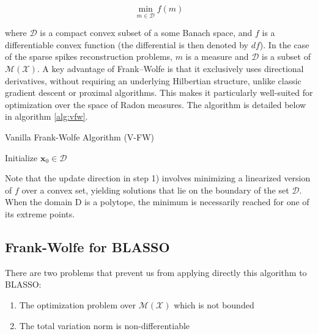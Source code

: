 \documentclass[a4paper,12pt,oneside]{report}
\theoremstyle{named}
\begin{document}
\begin{equation}
    \min_{m \in \mathcal{D}} f(m)
\end{equation}

where $\mathcal{D}$ is a compact convex subset of a some Banach space, and $f$ is a differentiable convex function (the differential is then denoted by $df$). In the case of the sparse spikes reconstruction problems, $m$ is a measure and $\mathcal{D}$ is a subset of $\mathcal{M}(\mathcal{X})$. A key advantage of Frank–Wolfe is that it exclusively uses directional derivatives, without requiring an underlying Hilbertian structure, unlike classic gradient descent or proximal algorithms. This makes it particularly well-suited for optimization over the space of Radon measures.  The algorithm is detailed below in algorithm \ref{alg:vfw}. \\

\begin{algorithm}[h!]
\DontPrintSemicolon
\caption{Vanilla Frank-Wolfe Algorithm (V-FW)}
\label{alg:vfw}
Initialize $\mathbf{x}_0 \in \mathcal{D}$ \;
\end{algorithm}

Note that the update direction in step 1) involves minimizing a linearized version of $f$ over a convex set, yielding solutions that lie on the boundary of the set $\mathcal{D}$. When the domain D is a polytope, the minimum is necessarily reached for one of its extreme points.

\subsection{Frank-Wolfe for BLASSO}
There are two problems that prevent us from applying directly this algorithm to BLASSO:

\begin{enumerate}
    \item The optimization problem over $\mathcal{M}(\mathcal{X})$ which is not bounded
    \item The  total variation norm is non-differentiable
\end{enumerate}
\end{document}
